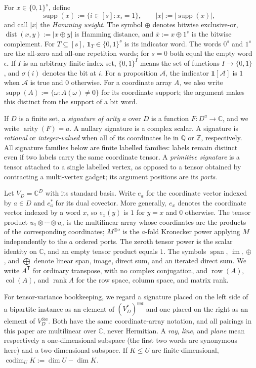 \documentclass[11pt]{article}
\theoremstyle{definition}
\theoremstyle{remark}
\newcommand{\C}{\mathbb C}
\newcommand{\Q}{\mathbb Q}
\newcommand{\bits}{\{0,1\}}
\newcommand{\supp}{\operatorname{supp}}
\newcommand{\arity}{\operatorname{arity}}
\newcommand{\dist}{\operatorname{dist}}
\newcommand{\one}{\mathbf 1}
\newcommand{\trans}{\mathsf T}
\newcommand{\row}{\operatorname{row}}
\newcommand{\Span}{\operatorname{span}}
\newcommand{\rank}{\operatorname{rank}}
\begin{document}
For $x\in\bits^s$, define
\[
  \supp(x):=\{i\in[s]:x_i=1\},\qquad
  |x|:=|\supp(x)|,
\]
and call $|x|$ the \emph{Hamming weight}.  The symbol $\oplus$ denotes
bitwise exclusive-or,
$\dist(x,y):=|x\oplus y|$ is Hamming distance, and
$\bar x:=x\oplus1^s$ is the bitwise complement.  For $T\subseteq[s]$,
$\one_T\in\bits^s$ is its indicator word.  The words $0^s$ and $1^s$ are
the all-zero and all-one repetition words; for $s=0$ both equal the empty
word $\epsilon$.  If $I$ is an arbitrary finite index set, $\bits^I$
means the set of functions $I\to\bits$, and $\sigma(i)$ denotes the bit at
$i$.  For a proposition $\mathcal A$, the indicator
$\mathbf 1[\mathcal A]$ is $1$ when $\mathcal A$ is true and $0$ otherwise.
For a coordinate array $A$, we also write
$\supp(A):=\{\omega:A(\omega)\ne0\}$ for its coordinate support; the
argument makes this distinct from the support of a bit word.

If $D$ is a finite set, a \emph{signature of arity $a$} over $D$ is a
function $F\colon D^a\to\C$, and we write $\arity(F)=a$.  A nullary
signature is a complex scalar.  A signature is \emph{rational} or
\emph{integer-valued} when all of its coordinates lie in $\Q$ or
$\mathbb Z$, respectively.  All signature families below are finite
labelled families: labels remain distinct even if two labels carry the same
coordinate tensor.  A \emph{primitive signature} is a tensor attached to a
single labelled vertex, as opposed to a tensor obtained by contracting a
multi-vertex gadget; its argument positions are its \emph{ports}.

Let $V_D=\C^D$ with its standard basis.  Write $e_a$ for the coordinate
vector indexed by $a\in D$ and $e_a^*$ for its dual covector.  More
generally, $e_x$ denotes the coordinate vector indexed by a word $x$, so
$e_x(y)$ is $1$ for $y=x$ and $0$ otherwise.  The tensor product
$u_1\otimes\cdots\otimes u_a$ is the multilinear array whose coordinates
are the products of the corresponding coordinates; $M^{\otimes a}$ is the
$a$-fold Kronecker power applying $M$ independently to the $a$ ordered
ports.  The zeroth tensor power is the scalar identity on $\C$, and an empty
tensor product equals $1$.  The symbols $\Span$, $\operatorname{im}$,
$\oplus$, and $\bigoplus$ denote linear span, image, direct sum, and an
iterated direct sum.  We write $A^{\trans}$ for ordinary transpose, with no complex
conjugation, and $\row(A)$, $\operatorname{col}(A)$, and $\rank A$ for the
row space, column space, and matrix rank.

For tensor-variance bookkeeping, we regard a signature placed on the left
side of a bipartite instance as an element of $(V_D^*)^{\otimes a}$ and one
placed on the right as an element of $V_D^{\otimes a}$.  Both have the same
coordinate-array notation, and all pairings in this paper are multilinear
over $\C$, never Hermitian.  A \emph{ray}, \emph{line}, and \emph{plane}
mean respectively a one-dimensional subspace (the first two words are
synonymous here) and a two-dimensional subspace.  If $K\le U$ are
finite-dimensional, $\operatorname{codim}_U K:=\dim U-\dim K$.
\end{document}
